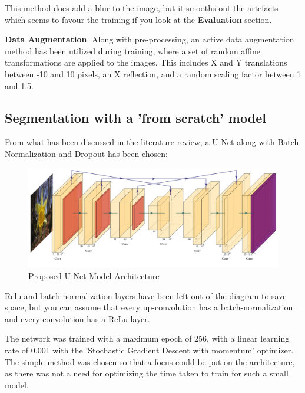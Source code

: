 \documentclass{article}
\begin{document}
This method does add a blur to the image, but it smooths out the artefacts which seems to favour the training if you look at the \textbf{Evaluation} section.


\textbf{Data Augmentation}. Along with pre-processing, an active data augmentation method has been utilized during training, where a set of random affine transformations are applied to the images. This includes X and Y translations between -10 and 10 pixels, an X reflection, and a random scaling factor between 1 and 1.5.

\subsection{Segmentation with a 'from scratch' model}

From what has been discussed in the literature review, a U-Net along with Batch Normalization and Dropout has been chosen:

\begin{figure}[H]
    \includegraphics[width=\linewidth]{unet.pdf}
    \caption{Proposed U-Net Model Architecture}
\end{figure}

Relu and batch-normalization layers have been left out of the diagram to save space, but you can assume that every up-convolution has a batch-normalization and every convolution has a ReLu layer.

The network was trained with a maximum epoch of 256, with a linear learning rate of 0.001 with the 'Stochastic Gradient Descent with momentum' optimizer. The simple method was chosen so that a focus could be put on the architecture, as there was not a need for optimizing the time taken to train for such a small model.
\end{document}
